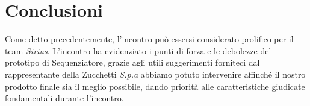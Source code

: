 \section{Conclusioni}
Come detto precedentemente, l'incontro può essersi considerato prolifico per il team \textit{Sirius}. L'incontro ha evidenziato i punti di forza e le debolezze del prototipo di Sequenziatore, grazie agli utili suggerimenti forniteci dal rappresentante della Zucchetti \textit{S.p.a} abbiamo potuto intervenire affinché il nostro prodotto finale sia il meglio possibile, dando priorità alle caratteristiche giudicate fondamentali durante l'incontro.